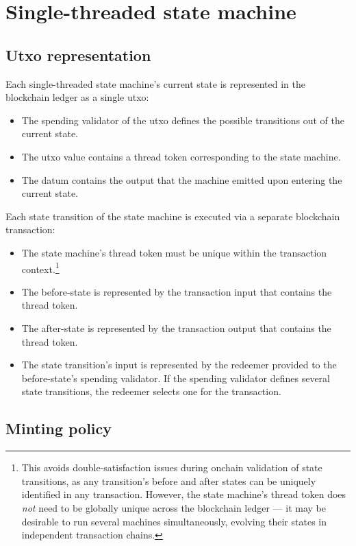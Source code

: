 \documentclass[../midgard.tex]{subfiles}
\begin{document}
\section{Single-threaded state machine}
\label{h:single-threaded-state-machine}

\subsection{Utxo representation}
\label{h:single-threaded-state-machine-utxo-representation}

Each single-threaded state machine's current state is represented in the blockchain ledger as a single utxo:
\begin{itemize}
    \item The spending validator of the utxo defines the possible transitions out of the current state.
    \item The utxo value contains a thread token corresponding to the state machine.
    \item The datum contains the output that the machine emitted upon entering the current state.
\end{itemize}

Each state transition of the state machine is executed via a separate blockchain transaction:
\begin{itemize}
    \item The state machine's thread token must be unique within the transaction context.\footnote{This avoids double-satisfaction issues during onchain validation of state transitions, as any transition's before and after states can be uniquely identified in any transaction. However, the state machine's thread token does \emph{not} need to be globally unique across the blockchain ledger --- it may be desirable to run several machines simultaneously, evolving their states in independent transaction chains.}
    \item The before-state is represented by the transaction input that contains the thread token.
    \item The after-state is represented by the transaction output that contains the thread token.
    \item The state transition's input is represented by the redeemer provided to the before-state's spending validator. If the spending validator defines several state transitions, the redeemer selects one for the transaction.
\end{itemize}

\subsection{Minting policy}
\label{h:single-threaded-state-machine-minting-policy}
\end{document}
